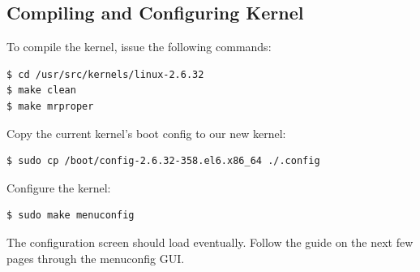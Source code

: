 \subsection{Compiling and Configuring Kernel}
To compile the kernel, issue the following commands:
\begin{snugshade}\begin{verbatim}
$ cd /usr/src/kernels/linux-2.6.32
$ make clean
$ make mrproper
\end{verbatim}\end{snugshade}\noindent
Copy the current kernel's boot config to our new kernel:
\begin{snugshade}\begin{verbatim}
$ sudo cp /boot/config-2.6.32-358.el6.x86_64 ./.config
\end{verbatim}\end{snugshade}\noindent
Configure the kernel: 
\begin{snugshade}\begin{verbatim}
$ sudo make menuconfig
\end{verbatim}\end{snugshade}\noindent
The configuration screen should load eventually. Follow the guide on the next few pages through the menuconfig GUI.
\newpage

